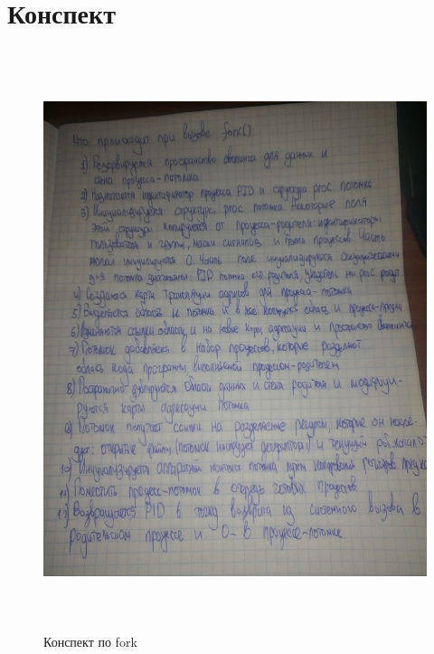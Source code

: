 \chapter*{Конспект}

\FloatBarrier
\begin{figure}[h]
	\begin{center}
		\includegraphics[width = \linewidth, height = 17cm ]{inc/fork.jpg}
	\end{center}
	\caption{Конспект по fork}
\end{figure}
\FloatBarrier

